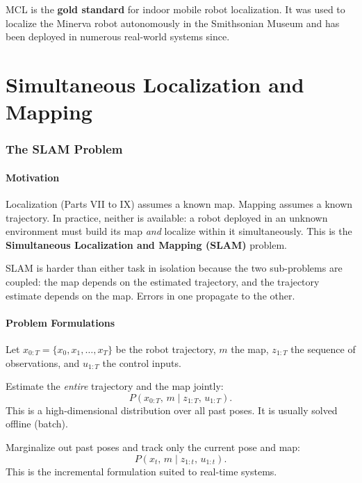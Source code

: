 \documentclass[11pt,a4paper]{article}
\theoremstyle{definition}
\theoremstyle{plain}
\theoremstyle{remark}
\begin{document}
MCL is the \textbf{gold standard} for indoor mobile robot localization. It was used to localize the Minerva robot autonomously in the Smithsonian Museum and has been deployed in numerous real-world systems since.

\part{Simultaneous Localization and Mapping}

\section{The SLAM Problem}

\subsection{Motivation}

Localization (Parts VII to IX) assumes a known map. Mapping assumes a known trajectory. In practice, neither is available: a robot deployed in an unknown environment must build its map \emph{and} localize within it simultaneously. This is the \textbf{Simultaneous Localization and Mapping (SLAM)} problem.

SLAM is harder than either task in isolation because the two sub-problems are coupled: the map depends on the estimated trajectory, and the trajectory estimate depends on the map. Errors in one propagate to the other.

\subsection{Problem Formulations}

Let $x_{0:T} = \{x_0, x_1, \ldots, x_T\}$ be the robot trajectory, $m$ the map, $z_{1:T}$ the sequence of observations, and $u_{1:T}$ the control inputs.

\begin{tcolorbox}[colback=blue!5!white,colframe=blue!75!black,title=\textbf{Full SLAM}]
Estimate the \emph{entire} trajectory and the map jointly:
\[
    P(x_{0:T},\, m \mid z_{1:T},\, u_{1:T}).
\]
This is a high-dimensional distribution over all past poses. It is usually solved offline (batch).
\end{tcolorbox}

\begin{tcolorbox}[colback=blue!5!white,colframe=blue!75!black,title=\textbf{Online SLAM}]
Marginalize out past poses and track only the current pose and map:
\[
    P(x_t,\, m \mid z_{1:t},\, u_{1:t}).
\]
This is the incremental formulation suited to real-time systems.
\end{tcolorbox}
\end{document}

